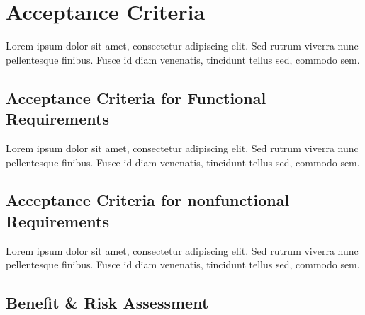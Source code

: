 \newpage %

\renewcommand{\thesection}{\Roman{section}} %

\tableofcontents %
\newpage






\section{Acceptance Criteria}
Lorem ipsum dolor sit amet, consectetur adipiscing elit. Sed rutrum viverra nunc pellentesque finibus. Fusce id diam venenatis, tincidunt tellus sed, commodo sem.

\subsection*{Acceptance Criteria for Functional Requirements}
Lorem ipsum dolor sit amet, consectetur adipiscing elit. Sed rutrum viverra nunc pellentesque finibus. Fusce id diam venenatis, tincidunt tellus sed, commodo sem.

\subsection*{Acceptance Criteria for nonfunctional Requirements}
Lorem ipsum dolor sit amet, consectetur adipiscing elit. Sed rutrum viverra nunc pellentesque finibus. Fusce id diam venenatis, tincidunt tellus sed, commodo sem.

\subsection*{Benefit \& Risk Assessment}

